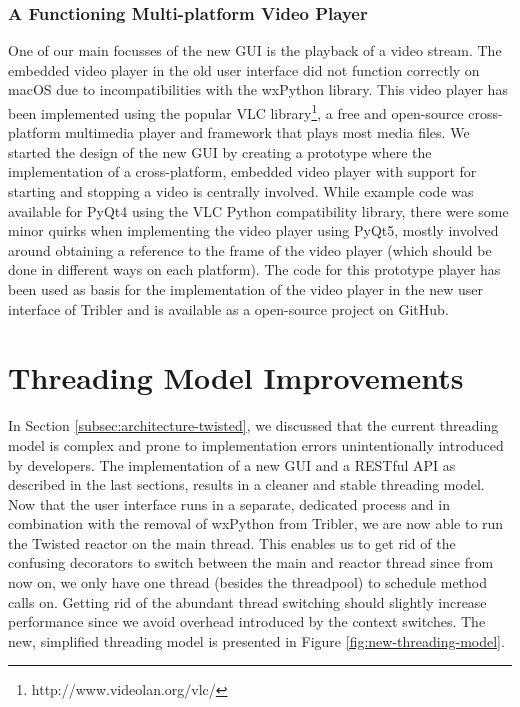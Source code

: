 \subsubsection{\textbf{A Functioning Multi-platform Video Player}}
One of our main focusses of the new GUI is the playback of a video stream. The embedded video player in the old user interface did not function correctly on macOS due to incompatibilities with the wxPython library. This video player has been implemented using the popular VLC library\footnote{http://www.videolan.org/vlc/}, a free and open-source cross-platform multimedia player and framework that plays most media files. We started the design of the new GUI by creating a prototype where the implementation of a cross-platform, embedded video player with support for starting and stopping a video is centrally involved. While example code was available for PyQt4 using the VLC Python compatibility library, there were some minor quirks when implementing the video player using PyQt5, mostly involved around obtaining a reference to the frame of the video player (which should be done in different ways on each platform). The code for this prototype player has been used as basis for the implementation of the video player in the new user interface of Tribler and is available as a open-source project on GitHub\cite{vos2016vlc}.

\section{Threading Model Improvements}
\label{sec:threading-model-improvements}
In Section \ref{subsec:architecture-twisted}, we discussed that the current threading model is complex and prone to implementation errors unintentionally introduced by developers. The implementation of a new GUI and a RESTful API as described in the last sections, results in a cleaner and stable threading model. Now that the user interface runs in a separate, dedicated process and in combination with the removal of wxPython from Tribler, we are now able to run the Twisted reactor on the main thread. This enables us to get rid of the confusing decorators to switch between the main and reactor thread since from now on, we only have one thread (besides the threadpool) to schedule method calls on. Getting rid of the abundant thread switching should slightly increase performance since we avoid overhead introduced by the context switches. The new, simplified threading model is presented in Figure \ref{fig:new-threading-model}.

